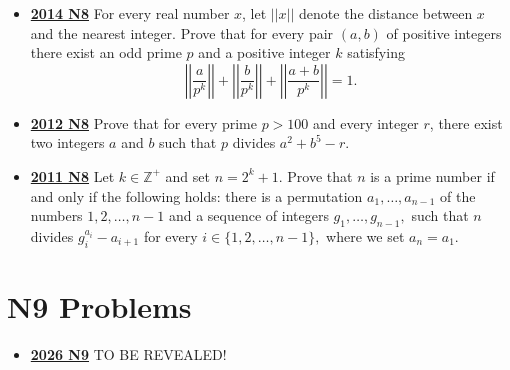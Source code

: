 \documentclass[11pt]{scrartcl}
\begin{document}
\begin{itemize}[leftmargin=*]
Find all strictly increasing functions $f: \mathbb{Z} \to \mathbb{Z}$ such that
\[\mho(f(a) - f(b)) \leqslant \mho(a - b) \quad \text{for all integers } a \text{ and } b \text{ with } a > b.\]

\item  \href{https://artofproblemsolving.com/community/c6h1113204p5083578}{\textbf{2014 N8}} For every real number $x$, let $||x||$ denote the distance between $x$ and the nearest integer.
Prove that for every pair $(a, b)$ of positive integers there exist an odd prime $p$ and a positive integer $k$ satisfying\[\displaystyle\left|\left|\frac{a}{p^k}\right|\right|+\left|\left|\frac{b}{p^k}\right|\right|+\left|\left|\frac{a+b}{p^k}\right|\right|=1.\]
\item  \href{https://artofproblemsolving.com/community/c6h545767p3156853}{\textbf{2012 N8}} Prove that for every prime $p>100$ and every integer $r$, there exist two integers $a$ and $b$ such that $p$ divides $a^2+b^5-r$.
\item  \href{https://artofproblemsolving.com/community/c6h488545p2737657}{\textbf{2011 N8}} Let $k \in \mathbb{Z}^+$ and set $n=2^k+1.$ Prove that $n$ is a prime number if and only if the following holds: there is a permutation $a_{1},\dots,a_{n-1}$ of the numbers $1,2, \dots, n-1$ and a sequence of integers $g_{1},\dots,g_{n-1},$ such that $n$ divides $g^{a_i}_i - a_{i+1}$ for every $i \in \{1,2,\dots,n-1\},$ where we set $a_n = a_1.$
\end{itemize}

\newpage
\section*{N9 Problems}  \label{N9}
\begin{itemize}[leftmargin=*]

\item \href{https://www.imo-official.org/assets/documents/problems/2026/IMO2026SL.pdf}{\textbf{2026 N9}} TO BE REVEALED!
\end{itemize}
\end{document}

